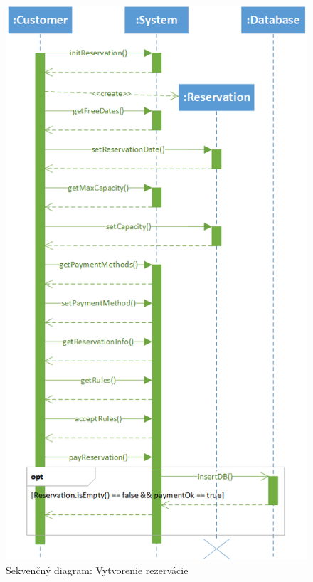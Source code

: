 \begin{figure}[!htbp]
    \centering
    \includegraphics[width=.75\linewidth]{img/seq_createReservation.png}
    \caption{Sekvenčný diagram: Vytvorenie rezervácie}
    \label{seq_diagram_createRes}
\end{figure}

\newpage

